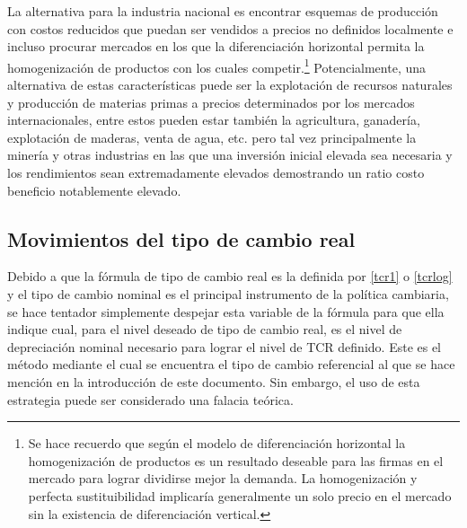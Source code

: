 \documentclass[12pt,letterpaper]{article}
\begin{document}
La alternativa para la industria nacional es encontrar esquemas de producción con costos reducidos que puedan ser vendidos a precios no definidos localmente e incluso procurar mercados en los que la diferenciación horizontal permita la homogenización de productos con los cuales competir.\footnote{Se hace recuerdo que según el modelo de diferenciación horizontal la homogenización de productos es un resultado deseable para las firmas en el mercado para lograr dividirse mejor la demanda. La homogenización y perfecta sustituibilidad implicaría generalmente un solo precio en el mercado sin la existencia de diferenciación vertical.} Potencialmente, una alternativa de estas características puede ser la explotación de recursos naturales y producción de materias primas a precios determinados por los mercados internacionales, entre estos pueden estar también la agricultura, ganadería, explotación de maderas, venta de agua, etc. pero tal vez principalmente la minería y otras industrias en las que una inversión inicial elevada sea necesaria y los rendimientos sean extremadamente elevados demostrando un ratio costo beneficio notablemente elevado.




\subsection{Movimientos del tipo de cambio real}
Debido a que la fórmula de tipo de cambio real es la definida por \ref{tcr1} o \ref{tcrlog} y el tipo de cambio nominal es el principal instrumento de la política cambiaria, se hace tentador simplemente despejar esta variable de la fórmula para que ella indique cual, para el nivel deseado de tipo de cambio real, es el nivel de depreciación nominal necesario para lograr el nivel de TCR definido. Este es el método mediante el cual se encuentra el tipo de cambio referencial al que se hace mención en la introducción de este documento. Sin embargo, el uso de esta estrategia puede ser considerado una falacia teórica.
\end{document}
